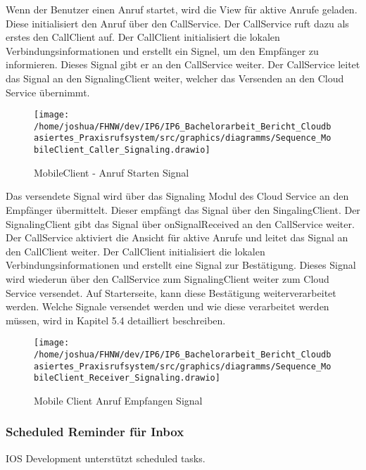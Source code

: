 Wenn der Benutzer einen Anruf startet, wird die View für aktive Anrufe geladen.
Diese initialisiert den Anruf über den CallService.
Der CallService ruft dazu als erstes den CallClient auf.
Der CallClient initialisiert die lokalen Verbindungsinformationen und erstellt ein Signel, um den Empfänger zu informieren.
Dieses Signal gibt er an den CallService weiter.
Der CallService leitet das Signal an den SignalingClient weiter, welcher das Versenden an den Cloud Service übernimmt.

\begin{figure}[h]
    \centering
    \begin{minipage}[b]{0.8\textwidth}
        \texttt{[image: /home/joshua/FHNW/dev/IP6/IP6\_Bachelorarbeit\_Bericht\_Cloudbasiertes\_Praxisrufsystem/src/graphics/diagramms/Sequence\_MobileClient\_Caller\_Signaling.drawio]}
        \caption{MobileClient - Anruf Starten Signal}
    \end{minipage}
\end{figure}

Das versendete Signal wird über das Signaling Modul des Cloud Service an den Empfänger übermittelt.
Dieser empfängt das Signal über den SingalingClient.
Der SignalingClient gibt das Signal über onSignalReceived an den CallService weiter.
Der CallService aktiviert die Ansicht für aktive Anrufe und leitet das Signal an den CallClient weiter.
Der CallClient initialisiert die lokalen Verbindungsinformationen und erstellt eine Signal zur Bestätigung.
Dieses Signal wird wiederun über den CallService zum SignalingClient weiter zum Cloud Service versendet.
Auf Starterseite, kann diese Bestätigung weiterverarbeitet werden.
Welche Signale versendet werden und wie diese verarbeitet werden müssen, wird in Kapitel 5.4 detailliert beschreiben.

\begin{figure}[h]
    \centering
    \begin{minipage}[b]{0.8\textwidth}
        \texttt{[image: /home/joshua/FHNW/dev/IP6/IP6\_Bachelorarbeit\_Bericht\_Cloudbasiertes\_Praxisrufsystem/src/graphics/diagramms/Sequence\_MobileClient\_Receiver\_Signaling.drawio]}
        \caption{Mobile Client Anruf Empfangen Signal}
    \end{minipage}
\end{figure}


\subsubsection{Scheduled Reminder für Inbox}
IOS Development unterstützt scheduled tasks.

\clearpage
